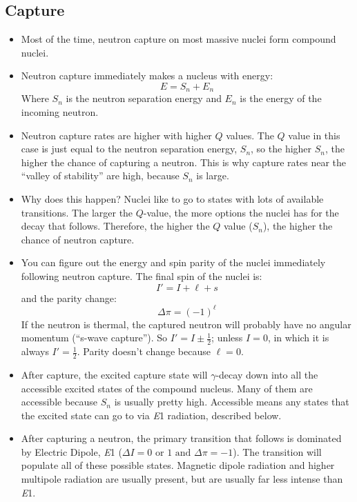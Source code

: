 \documentclass[letter]{article}
\begin{document}
\subsection{Capture}
\begin{itemize}
\item Most of the time, neutron capture on most massive nuclei
  form compound nuclei.~\cite[Lec 26]{lecture}
\item Neutron capture immediately makes a nucleus with energy:
  \begin{equation*}
    E = S_n + E_n
  \end{equation*}
  Where $S_n$ is the neutron separation energy and $E_n$ is the energy
  of the incoming neutron.~\cite[Lec 27]{lecture}
\item Neutron capture rates are higher with higher $Q$ values. The $Q$
  value in this case is just equal to the neutron separation energy,
  $S_n$, so the higher $S_n$, the higher the chance of capturing a
  neutron. This is why capture rates near the ``valley of stability''
  are high, because $S_n$ is large.~\cite[Lec 27]{lecture}
\item Why does this happen? Nuclei like to go to states with lots of
  available transitions. The larger the $Q$-value, the more options
  the nuclei has for the decay that follows. Therefore, the higher the
  $Q$ value ($S_n$), the higher the chance of neutron
  capture.~\cite[Lec 27]{lecture}
\item You can figure out the energy and spin parity of the nuclei
  immediately following neutron capture. The final spin of the nuclei is:
  \begin{equation*}
    I' = I + \ell + s
  \end{equation*}
  and the parity change:
  \begin{equation*}
    \Delta\pi = (-1)^{\ell}
  \end{equation*}
If the neutron is thermal, the captured neutron will probably have no
angular momentum (``s-wave capture''). So $I' = I \pm \frac{1}{2}$;
unless $I=0$, in which it is always $I' = \frac{1}{2}$. Parity doesn't
change because $\ell = 0$.~\cite[pp.463]{krane}
\item After capture, the excited capture state will $\gamma$-decay down into all
  the accessible excited states of the compound nucleus. Many of them are
  accessible because $S_n$ is usually pretty high. Accessible means
  any states that the excited state can go to via \textit{E}1
  radiation, described below.~\cite[pp. 463]{krane}
\item After capturing a neutron, the primary transition that follows
  is dominated by Electric Dipole, \textit{E}1
  ($\Delta{}I=0 \text{ or } 1 \text{ and } \Delta\pi=-1$). The
  transition will populate all of these possible states. Magnetic
  dipole radiation and higher multipole radiation are usually present,
  but are usually far less intense than \textit{E}1. ~\cite[Lec
  27]{lecture}


\end{itemize}
\end{document}
